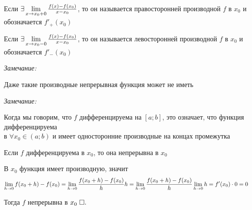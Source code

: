 \documentclass{article}
\begin{document}
\pagebreak


Если $\exists\slim{x\to x_0+0}\frac{f(x)-f(x_0)}{x-x_0}$, то он называется правосторонней производной $f$ в $x_0$ и обозначается $f'_{+}(x_0)$

Если $\exists\slim{x\to x_0-0}\frac{f(x)-f(x_0)}{x-x_0}$, то он называется левосторонней производной $f$ в $x_0$ и обозначается $f'_{-}(x_0)$

{\it Замечание:}

Даже такие производные непрерывная функция может не иметь

{\it Замечание:}

Когда мы говорим, что $f$ дифференцируема на $[a;b]$, это означает, что функция дифференцируема\\
в $\forall x_0 \in (a;b)$ и имеет односторонние производные на концах промежутка


\theorem

Если $f$ дифференцируема в $x_0$, то она непрерывна в $x_0$

\proof

В $x_0$ функция имеет производную, значит
\begin{align*}
	\slim{h\to 0}f(x_0+h)-f(x_0)=\slim{h\to 0}\frac{f(x_0+h)-f(x_0)}{h}h=\slim{h\to 0}\frac{f(x_0+h)-f(x_0)}{h}\slim{h\to 0}h=f'(x_0)\cdot 0=0
\end{align*}

Тогда $f$  непрерывна в $x_0\qed$
\end{document}

